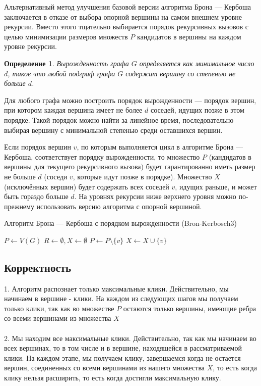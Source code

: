 \documentclass{article}
\newtheorem{theorem}{Определение}
\begin{document}
Альтернативный метод улучшения базовой версии алгоритма Брона — Кербоша заключается в отказе от выбора опорной вершины на самом внешнем уровне рекурсии. Вместо этого тщательно выбирается порядок рекурсивных вызовов с целью минимизации размеров множеств \( P \) кандидатов в вершины на каждом уровне рекурсии.

\begin{theorem}
Вырожденность графа \( G \) определяется как минимальное число \( d \), такое что любой подграф графа \( G \) содержит вершину со степенью не больше \( d \).
\end{theorem}

Для любого графа можно построить порядок вырожденности — порядок вершин, при котором каждая вершина имеет не более \( d \) соседей, идущих позже в этом порядке. Такой порядок можно найти за линейное время, последовательно выбирая вершину с минимальной степенью среди оставшихся вершин.

Если порядок вершин \( v \), по которым выполняется цикл в алгоритме Брона — Кербоша, соответствует порядку вырожденности, то множество \( P \) (кандидатов в вершины для текущего рекурсивного вызова) будет гарантированно иметь размер не больше \( d \) (соседи \( v \), которые идут позже в порядке). Множество \( X \) (исключённых вершин) будет содержать всех соседей \( v \), идущих раньше, и может быть гораздо больше \( d \). На уровнях рекурсии ниже верхнего уровня можно по-прежнему использовать версию алгоритма с опорной вершиной.

\begin{algorithm}
\caption{Алгоритм Брона — Кербоша с порядком вырожденности (Bron-Kerbosch3)}
\label{alg:bronkerbosch3}
\begin{algorithmic}[1]
    \State $P \gets V(G)$
    \State $R \gets \emptyset, X \gets \emptyset$
        \State {}
        \State $P \gets P \setminus \{v\}$
        \State $X \gets X \cup \{v\}$
    \EndFor
\EndProcedure
\end{algorithmic}
\end{algorithm}

\subsection{Корректность}

1. Алгоритм распознает только максимальные клики. Действительно, мы начинаем в вершине - клики. На каждом из следующих шагов мы получаем только клики, так как во множестве $P$ остаются только вершины, имеющие ребра со всеми вершинами из множества $X$ \\\\
2. Мы находим все максимальные клики. Действительно, так как мы начинаем во всех вершинах, то в том числе и в вершине, находящейся в рассматриваемой клики. На каждом этапе, мы получаем клику, завершаемся когда не остается вершин, соединенных со всеми вершинами из нашего множества $X$, то есть когда клику нельзя расширить, то есть когда достигли максимальную клику.
\end{document}
